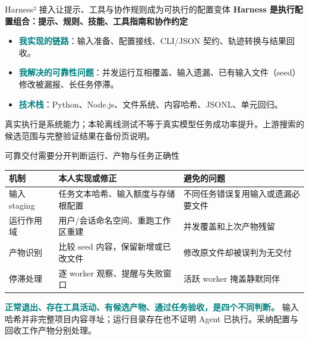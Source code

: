 \documentclass[aspectratio=169,10pt]{beamer}
\newcommand{\src}[1]{\vfill{\fontsize{6.7}{8}\selectfont\color{Muted}#1}\par}
\newcommand{\lead}[1]{{\color{Teal}\large\bfseries #1}\par\medskip}
\newcommand{\term}[1]{\textcolor{Teal}{\textbf{#1}}}
\begin{document}
\begin{frame}{Harness² 接入让提示、工具与协作规则成为可执行的配置变体}
\lead{Harness 是执行配置组合：提示、规则、技能、工具指南和协作约定}
\begin{center}
\end{center}
\begin{itemize}
\item \term{我实现的链路}：输入准备、配置接线、CLI/JSON 契约、轨迹转换与结果回收。
\item \term{我解决的可靠性问题}：并发运行互相覆盖、输入遗漏、已有输入文件（seed）修改被漏报、长任务停滞。
\item \term{技术栈}：Python、Node.js、文件系统、内容哈希、JSONL、单元回归。
\end{itemize}
\src{真实执行是系统能力；本轮离线测试不等于真实模型任务成功率提升。上游搜索的候选范围与完整验证结果在备份页说明。}
\end{frame}

\begin{frame}{可靠交付需要分开判断运行、产物与任务正确性}
\renewcommand{\arraystretch}{1.6}
\begin{tabularx}{\textwidth}{@{}lYY@{}}
\toprule 机制 & 本人实现或修正 & 避免的问题 \\
\midrule
输入 staging & 任务文本哈希、输入额度与存储根配置 & 不同任务错误复用输入或遗漏必要文件 \\
运行作用域 & 用户/会话命名空间、重跑工作区重建 & 并发覆盖和上次产物残留 \\
产物识别 & 比较 seed 内容，保留新增或已改文件 & 修改原文件却被误判为无交付 \\
停滞处理 & 逐 worker 观察、提醒与失败窗口 & 活跃 worker 掩盖静默同伴 \\
\bottomrule
\end{tabularx}
\medskip
\term{正常退出、存在工具活动、有候选产物、通过任务验收，是四个不同判断。}
\src{输入哈希并非完整项目内容寻址；运行目录存在也不证明 Agent 已执行。采纳配置与回收工作产物分别处理。}
\end{frame}
\end{document}
